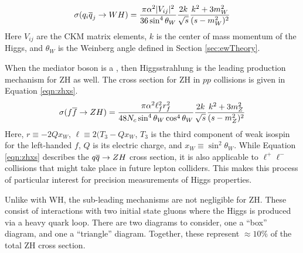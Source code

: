 \begin{equation}\begin{split}\label{eqn:whxs}
\sigma(q_i\overline{q}_j\to WH)=\frac{\pi\alpha^2 |V_{ij}|^2}{36 \sin^4\theta_W} \frac{2k}{\sqrt{s}} \frac{k^2+3m^2_W}{(s-m^2_W)^2}
\end{split}\end{equation} 
Here $V_{ij}$ are the CKM matrix elements, $k$ is the center of mass momentum of the Higgs, and $\theta_W$ is the Weinberg angle defined in Section \ref{sec:ewTheory}.

When the mediator boson is a \Z, then Higgsstrahlung is the leading production mechanism for ZH as well.
The cross section for ZH in $pp$ collisions is given in Equation \ref{eqn:zhxs}.
\begin{equation}\begin{split}\label{eqn:zhxs}
\sigma(f\overline{f}\to ZH)=\frac{\pi\alpha^2 \ell_f^2r_f^2}{48N_c\sin^4\theta_W\cos^4\theta_W} \frac{2k}{\sqrt{s}} \frac{k^2+3m^2_Z}{(s-m^2_Z)^2}
\end{split}\end{equation} 
Here, $r\equiv-2Qx_W$, $\ell\equiv2(T_3-Qx_W$,
$T_3$ is the third component of weak isospin for the left-handed $f$, $Q$ is its electric charge, and $x_W\equiv\sin^2\theta_W$.
While Equation \ref{eqn:zhxs} describes the $q\overline{q}\to ZH$ cross section, it is also applicable to $\ell^+\ell^-$ collisions that might take place in future lepton colliders.
This makes this process of particular interest for precision measurements of Higgs properties.

Unlike with WH, the sub-leading mechanisms are not negligible for ZH.
These consist of interactions with two initial state gluons where the Higgs is produced via a heavy quark loop.
There are two diagrams to consider, one a ``box'' diagram, and one a ``triangle'' diagram.
Together, these represent $\approx10\%$ of the total ZH cross section.

